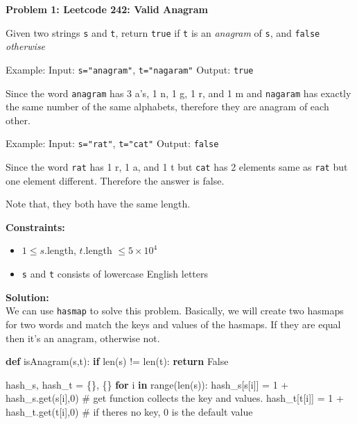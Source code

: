 \documentclass[
  letterpaper,
  DIV=11,
  numbers=noendperiod]{scrartcl}
\newenvironment{Shaded}{\begin{snugshade}}{\end{snugshade}}
\newcommand{\BuiltInTok}[1]{\textcolor[rgb]{0.00,0.23,0.31}{#1}}
\newcommand{\CommentTok}[1]{\textcolor[rgb]{0.37,0.37,0.37}{#1}}
\newcommand{\ControlFlowTok}[1]{\textcolor[rgb]{0.00,0.23,0.31}{\textbf{#1}}}
\newcommand{\DecValTok}[1]{\textcolor[rgb]{0.68,0.00,0.00}{#1}}
\newcommand{\KeywordTok}[1]{\textcolor[rgb]{0.00,0.23,0.31}{\textbf{#1}}}
\newcommand{\NormalTok}[1]{\textcolor[rgb]{0.00,0.23,0.31}{#1}}
\newcommand{\OperatorTok}[1]{\textcolor[rgb]{0.37,0.37,0.37}{#1}}
\newcommand{\VariableTok}[1]{\textcolor[rgb]{0.07,0.07,0.07}{#1}}
\providecommand{\tightlist}{%
  \setlength{\itemsep}{0pt}\setlength{\parskip}{0pt}}
\begin{document}
\begin{tcolorbox}[enhanced jigsaw, arc=.35mm, bottomrule=.15mm, breakable, colback=white, colframe=quarto-callout-note-color-frame, left=2mm, leftrule=.75mm, opacityback=0, rightrule=.15mm, toprule=.15mm]

\vspace{-3mm}\textbf{Problem 1: Leetcode 242: Valid Anagram}\vspace{3mm}

Given two strings \texttt{s} and \texttt{t}, return \texttt{true} if
\texttt{t} is an \emph{anagram} of \texttt{s}, and \texttt{false}
\emph{otherwise}

Example: Input: \texttt{s="anagram"}, \texttt{t="nagaram"} Output:
\texttt{true}

Since the word \texttt{anagram} has 3 a's, 1 n, 1 g, 1 r, and 1 m and
\texttt{nagaram} has exactly the same number of the same alphabets,
therefore they are anagram of each other.

Example: Input: \texttt{s="rat"}, \texttt{t="cat"} Output:
\texttt{false}

Since the word \texttt{rat} has 1 r, 1 a, and 1 t but \texttt{cat} has 2
elements same as \texttt{rat} but one element different. Therefore the
answer is false.

Note that, they both have the same length.

\textbf{Constraints:}

\begin{itemize}
\tightlist
\item
  \(1\le s\).length, \(t\).length \(\le 5\times 10^4\)\\
\item
  \texttt{s} and \texttt{t} consists of lowercase English letters
\end{itemize}

\textbf{Solution:}\\
We can use \texttt{hasmap} to solve this problem. Basically, we will
create two hasmaps for two words and match the keys and values of the
hasmaps. If they are equal then it's an anagram, otherwise not.

\begin{Shaded}
\begin{Highlighting}[]
\KeywordTok{def}\NormalTok{ isAnagram(s,t):}
  \ControlFlowTok{if} \BuiltInTok{len}\NormalTok{(s) }\OperatorTok{!=} \BuiltInTok{len}\NormalTok{(t):}
    \ControlFlowTok{return} \VariableTok{False} 
  
\NormalTok{  hash\_s, hash\_t }\OperatorTok{=}\NormalTok{ \{\}, \{\}}
  \ControlFlowTok{for}\NormalTok{ i }\KeywordTok{in} \BuiltInTok{range}\NormalTok{(}\BuiltInTok{len}\NormalTok{(s)):}
\NormalTok{    hash\_s[s[i]] }\OperatorTok{=} \DecValTok{1} \OperatorTok{+}\NormalTok{ hash\_s.get(s[i],}\DecValTok{0}\NormalTok{)  }\CommentTok{\# get function collects the key and values.}
\NormalTok{    hash\_t[t[i]] }\OperatorTok{=} \DecValTok{1} \OperatorTok{+}\NormalTok{ hash\_t.get(t[i],}\DecValTok{0}\NormalTok{)  }\CommentTok{\# if there\textquotesingle{}s no key, 0 is the default value}
  

\end{Highlighting}
\end{Shaded}
\end{tcolorbox}
\end{document}
